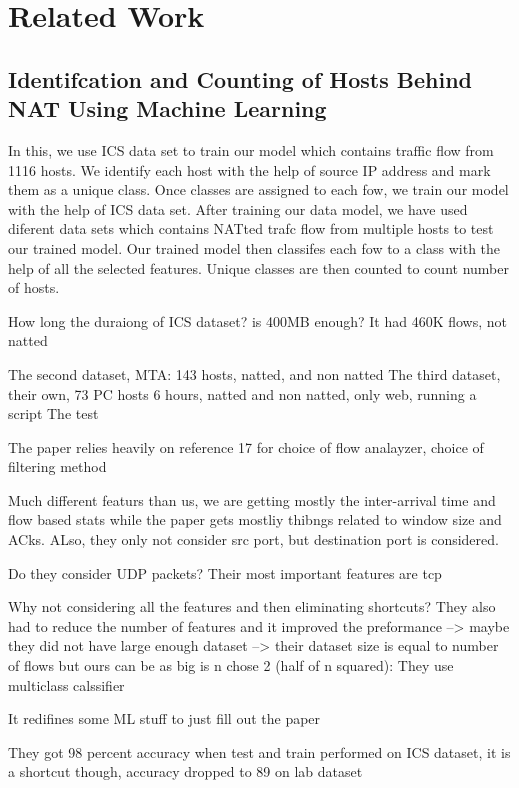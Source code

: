\section{Related Work}\label{sec:related}

\subsection{Identifcation and Counting of Hosts Behind NAT Using Machine
Learning \cite{shukla2022identification}}
In this, we use ICS data set to train our model which contains traffic flow from 1116 hosts. We identify each host with
the help of source IP address and mark them as a unique
class. Once classes are assigned to each fow, we train our
model with the help of ICS data set. After training our data
model, we have used diferent data sets which contains NATted trafc flow from multiple hosts to test our trained model.
Our trained model then classifes each fow to a class with
the help of all the selected features. Unique classes are then
counted to count number of hosts.

How long the duraiong of ICS dataset? is 400MB enough? It had 460K flows, not natted

The second dataset, MTA: 143 hosts, natted, and non natted
The third dataset, their own, 73 PC hosts 6 hours, natted and non natted, only web, running a script 
The test 

The paper relies heavily on reference 17 for choice of flow analayzer, choice of filtering method 

Much different featurs than us, we are getting mostly the inter-arrival time and flow based stats while the paper gets mostliy thibngs related to window size and ACks. 
ALso, they only not consider src port, but destination port is considered. 

Do they consider UDP packets? Their most important features are tcp

Why not considering all the features and then eliminating shortcuts?
They also had to reduce the number of features and it improved the preformance --> maybe they did not have large enough dataset --> their dataset size is equal to number of flows but ours can be as big is n chose 2 (half of n squared): They use multiclass calssifier 

It redifines some ML stuff to just fill out the paper 

They got 98 percent accuracy when test and train performed on ICS dataset, it is a shortcut though, accuracy dropped to 89 on lab dataset 



